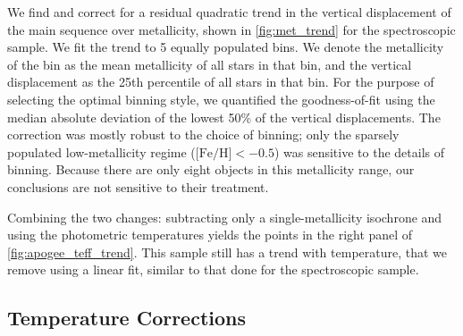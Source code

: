 \documentclass[twocolumn]{aastex6}
\newcommand{\Teff}{\ensuremath{T_{\textrm{eff}}}}
\newcommand{\MK}{\ensuremath{M_{Ks}}}
\newcommand{\feh}{\textrm{[Fe/H]}}
\begin{document}
We find and correct for a residual quadratic trend in the vertical 
displacement of the main sequence over metallicity, shown in 
\cref{fig:met_trend} for the spectroscopic sample.  We fit the trend to 5 
equally populated bins. We denote 
the metallicity of the bin as the mean metallicity of all stars in that bin, 
and the vertical displacement as the 25th percentile of all stars in that bin. 
For the purpose of selecting the optimal binning style, we quantified the 
goodness-of-fit using the median absolute deviation of the lowest
50\% of the vertical displacements. The correction was mostly robust to the choice 
of binning; only the sparsely populated low-metallicity regime 
(\(\feh{} < -0.5\)) was sensitive to the details of binning. Because there are 
only eight objects in this metallicity range, our conclusions are not 
sensitive to their treatment.

\begin{figure*}[htb]
    \centering
    \caption{\emph{Top Left}: Vertical displacement above a 1 Gyr,
        metallicity-adjusted MIST isochrone, empirically corrected for
        metallicity trends, for the cool sample with APOGEE temperatures. 
        A slight linear trend in \Teff{} was measured using five bins (shown in
        red). The best-fit relation is \(\Delta \MK{} = -0.000114
        \Teff{} + 0.546\) The median absolute deviation of the 50\% of the 
        sample showing the least luminosity excess within each bin is shown as 
        an error bar. \emph{Bottom Left:} The residuals after subtracting the 
        linear trend. Not shown are the two most metal-poor objects in the
    sample, which have substantially large 
residuals. {Top Right, Bottom Right:} Same as left except using
\citet{Pinsonneault12} temperatures, and subtracting off a constant
\feh{}=0.08 isochrone for all objects instead of a metallicity-adjusted
isochrone. The best-fit relation is \(\Delta \MK{} = -0.0000937 \Teff{}
+ 0.434\)}\label{fig:apogee_teff_trend}
\end{figure*}

Combining the two changes: subtracting only a single-metallicity isochrone and
using the photometric temperatures yields the points in the right panel of 
\cref{fig:apogee_teff_trend}.
This sample still has a trend with temperature, that we remove using a linear
fit, similar to that done for the spectroscopic sample.

\subsection{Temperature Corrections}
\end{document}
